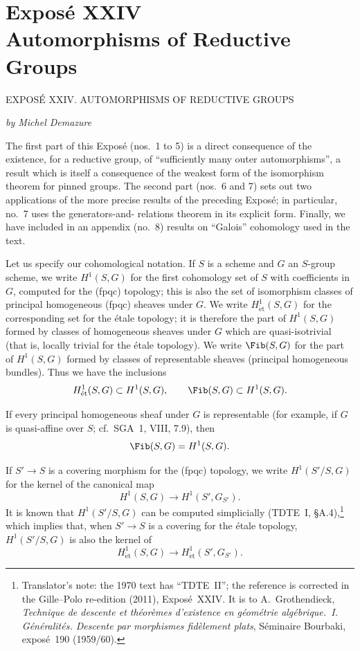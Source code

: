 
\chapter*{Exposé XXIV\\
Automorphisms of Reductive Groups}
  {EXPOSÉ XXIV. AUTOMORPHISMS OF REDUCTIVE GROUPS}

\begin{center}
  \textit{by Michel Demazure}
\end{center}

The first part of this Exposé (nos.~1 to 5) is a direct consequence of
the existence, for a reductive group, of ``sufficiently many outer
automorphisms'', a result which is itself a consequence of the weakest
form of the isomorphism theorem for pinned groups. The second part
(nos.~6 and 7) sets out two applications of the more precise results of
the preceding Exposé; in particular, no.~7 uses the generators-and-
relations theorem in its explicit form. Finally, we have included in
an appendix (no.~8) results on ``Galois'' cohomology used in the text.

Let us specify our cohomological notation. If \(S\) is a scheme and
\(G\) an \(S\)-group scheme, we write \(H^1(S,G)\) for the first
cohomology set of \(S\) with coefficients in \(G\), computed for the
\textup{(fpqc)} topology; this is also the set of isomorphism classes
of principal homogeneous \textup{(fpqc)} sheaves under \(G\). We write
\(H^1_{\mathrm{\acute et}}(S,G)\) for the corresponding set for the
étale topology; it is therefore the part of \(H^1(S,G)\) formed by
classes of homogeneous sheaves under \(G\) which are quasi-isotrivial
\textup{(that is, locally trivial for the étale topology)}. We write
\(\Fib(S,G)\) for the part of \(H^1(S,G)\) formed by classes of
representable sheaves \textup{(principal homogeneous bundles)}. Thus
we have the inclusions
\[
  H^1_{\mathrm{\acute et}}(S,G)\subset H^1(S,G),
  \qquad
  \Fib(S,G)\subset H^1(S,G).
\]

If every principal homogeneous sheaf under \(G\) is representable
\textup{(for example, if \(G\) is quasi-affine over \(S\); cf.\ SGA~1,
VIII, 7.9)}, then
\[
  \Fib(S,G)=H^1(S,G).
\]

If \(S'\to S\) is a covering morphism for the \textup{(fpqc)}
topology, we write \(H^1(S'/S,G)\) for the kernel of the canonical map
\[
  H^1(S,G)\longrightarrow H^1(S',G_{S'}).
\]
It is known that \(H^1(S'/S,G)\) can be computed simplicially
\textup{(TDTE~I, \S A.4)},\footnote{Translator's note: the 1970 text has ``TDTE~II''; the
reference is corrected in the Gille--Polo re-edition (2011), Exposé~XXIV. It is to A.~Grothendieck,
\emph{Technique de descente et théorèmes d'existence en géométrie algébrique.~I. Généralités.
Descente par morphismes fidèlement plats}, Séminaire Bourbaki, exposé~190 (1959/60).} which implies that, when \(S'\to S\) is a
covering for the étale topology, \(H^1(S'/S,G)\) is also the kernel of
\[
  H^1_{\mathrm{\acute et}}(S,G)
  \longrightarrow
  H^1_{\mathrm{\acute et}}(S',G_{S'}).
\]

